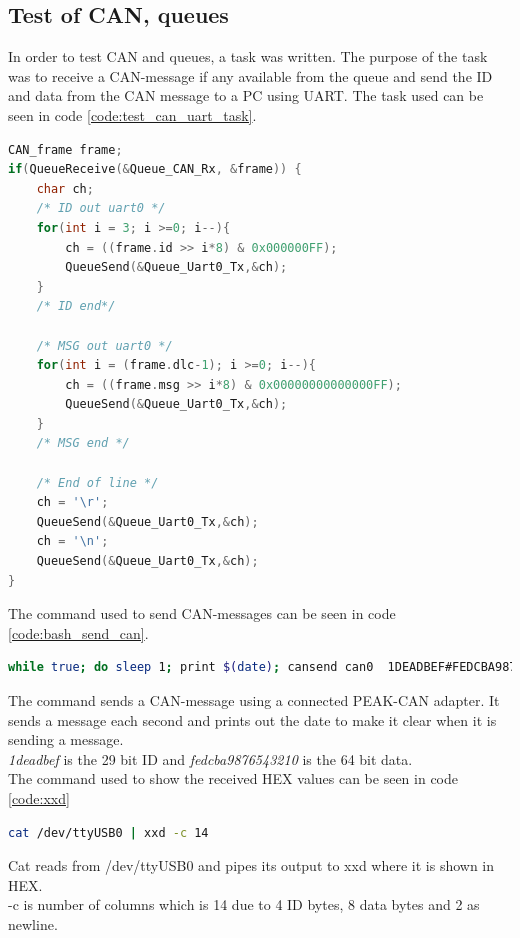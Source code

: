 \subsection*{Test of CAN, queues}
In order to test CAN and queues, a task was written. The purpose of the task was to receive a CAN-message if any available from the queue and send the ID and data from the CAN message to a PC using UART.
The task used can be seen in code \ref{code:test_can_uart_task}.


\begin{lstlisting}[language = c, caption = Task used to test CAN, label=code:test_can_uart_task]
CAN_frame frame;
if(QueueReceive(&Queue_CAN_Rx, &frame)) {
	char ch;
	/* ID out uart0 */
	for(int i = 3; i >=0; i--){
		ch = ((frame.id >> i*8) & 0x000000FF);
		QueueSend(&Queue_Uart0_Tx,&ch);
	}
	/* ID end*/

	/* MSG out uart0 */
	for(int i = (frame.dlc-1); i >=0; i--){
		ch = ((frame.msg >> i*8) & 0x00000000000000FF);
		QueueSend(&Queue_Uart0_Tx,&ch);
	}
	/* MSG end */

	/* End of line */
	ch = '\r';
	QueueSend(&Queue_Uart0_Tx,&ch);
	ch = '\n';
	QueueSend(&Queue_Uart0_Tx,&ch);
}
\end{lstlisting}
The command used to send CAN-messages can be seen in code \ref{code:bash_send_can}.

\begin{lstlisting}[language = bash, caption = Task used to test CAN, label=code:bash_send_can]
while true; do sleep 1; print $(date); cansend can0  1DEADBEF#FEDCBA9876543210; done
\end{lstlisting}
The command sends a CAN-message using a connected PEAK-CAN adapter. It sends a message each second and prints out the date to make it clear when it is sending a message.\\ \textit{1deadbef} is the 29 bit ID and \textit{fedcba9876543210} is the 64 bit data. \\


The command used to show the received HEX values can be seen in code \ref{code:xxd}

\begin{lstlisting}[language = bash, caption = Command used to get UART messages, label=code:xxd]
cat /dev/ttyUSB0 | xxd -c 14 
\end{lstlisting}
Cat reads from /dev/ttyUSB0 and pipes its output to xxd where it is shown in HEX.\\ -c is number of columns which is 14 due to 4 ID bytes, 8 data bytes and 2 as newline.\\

